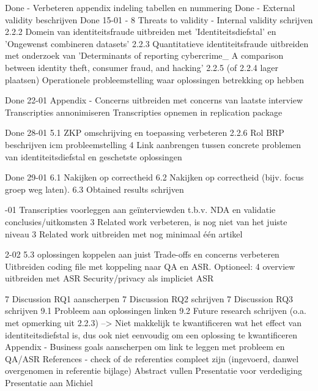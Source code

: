 Done - Verbeteren appendix indeling tabellen en nummering
Done - External validity beschrijven
Done 15-01 - 
8 Threats to validity - Internal validity schrijven
2.2.2 Domein van identiteitsfraude uitbreiden met 'Identiteitsdiefstal' en 'Ongewenst combineren datasets'
2.2.3 Quantitatieve identiteitsfraude uitbreiden met onderzoek van 'Determinants of reporting cybercrime_ A
comparison between identity theft, consumer fraud, and hacking'
2.2.5 (of 2.2.4 lager plaatsen) Operationele probleemstelling waar oplossingen betrekking op hebben

Done 22-01
Appendix - Concerns uitbreiden met concerns van laatste interview
Transcripties annonimiseren
Transcripties opnemen in replication package

Done 28-01
5.1 ZKP omschrijving en toepassing verbeteren
2.2.6 Rol BRP beschrijven icm probleemstelling
4 Link aanbrengen tussen concrete problemen van identiteitsdiefstal en geschetste oplossingen

Done 29-01
6.1 Nakijken op correctheid
6.2 Nakijken op correctheid (bijv. focus groep weg laten).
6.3 Obtained results schrijven

-01
Transcripties voorleggen aan geïnterviewden t.b.v. NDA en validatie conclusies/uitkomsten
3 Related work verbeteren, is nog niet van het juiste niveau
3 Related work uitbreiden met nog minimaal één artikel

2-02
5.3 oplossingen koppelen aan juist Trade-offs en concerns verbeteren
Uitbreiden coding file met koppeling naar QA en ASR.
Optioneel: 4 overview uitbreiden met ASR Security/privacy als impliciet ASR

7 Discussion RQ1 aanscherpen
7 Discussion RQ2 schrijven
7 Discussion RQ3 schrijven
9.1 Probleem aan oplossingen linken
9.2 Future research schrijven (o.a. met opmerking uit 2.2.3)
--> Niet makkelijk te kwantificeren wat het effect van identiteitsdiefstal is, dus ook niet eenvoudig om een oplossing te kwantificeren
Appendix - Business goals aanscherpen om link te leggen met probleem en QA/ASR
References - check of de referenties compleet zijn (ingevoerd, danwel overgenomen in referentie bijlage)
Abstract vullen
Presentatie voor verdediging
Presentatie aan Michiel